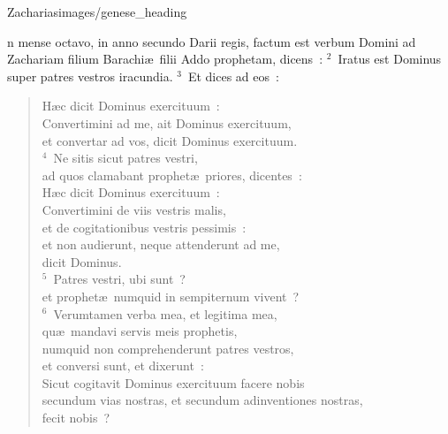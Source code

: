 {Zacharias}{images/genese_heading}


\bchapter
{}n mense octavo, in anno secundo Darii regis, factum est verbum Domini ad Zachariam filium Barachi\ae\ filii Addo prophetam, dicens~:
${}^{2}$~Iratus est Dominus super patres vestros iracundia.
${}^{3}$~Et dices ad eos~: \begin{verse}H\ae c dicit Dominus exercituum~:\\ Convertimini ad me, ait Dominus exercituum,\\ et convertar ad vos, dicit Dominus exercituum.\\
${}^{4}$~Ne sitis sicut patres vestri,\\ ad quos clamabant prophet\ae\ priores, dicentes~:\\ H\ae c dicit Dominus exercituum~:\\ Convertimini de viis vestris malis,\\ et de cogitationibus vestris pessimis~:\\ et non audierunt, neque attenderunt ad me,\\ dicit Dominus.\\
${}^{5}$~Patres vestri, ubi sunt~?\\ et prophet\ae\ numquid in sempiternum vivent~?\\
${}^{6}$~Verumtamen verba mea, et legitima mea,\\ qu\ae\ mandavi servis meis prophetis,\\ numquid non comprehenderunt patres vestros,\\ et conversi sunt, et dixerunt~:\\ Sicut cogitavit Dominus exercituum facere nobis\\ secundum vias nostras, et secundum adinventiones nostras,\\ fecit nobis~?\end{verse}


